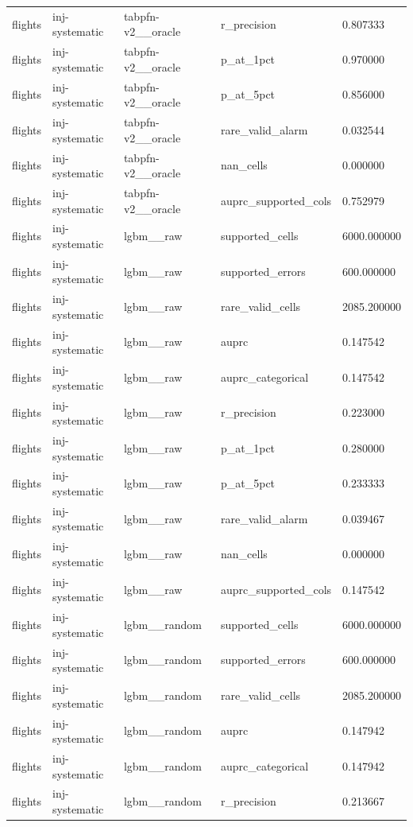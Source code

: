 \begin{tabular}{lllll}
flights & inj-systematic & tabpfn-v2\_\_oracle & r\_precision & 0.807333 \\
flights & inj-systematic & tabpfn-v2\_\_oracle & p\_at\_1pct & 0.970000 \\
flights & inj-systematic & tabpfn-v2\_\_oracle & p\_at\_5pct & 0.856000 \\
flights & inj-systematic & tabpfn-v2\_\_oracle & rare\_valid\_alarm & 0.032544 \\
flights & inj-systematic & tabpfn-v2\_\_oracle & nan\_cells & 0.000000 \\
flights & inj-systematic & tabpfn-v2\_\_oracle & auprc\_supported\_cols & 0.752979 \\
flights & inj-systematic & lgbm\_\_raw & supported\_cells & 6000.000000 \\
flights & inj-systematic & lgbm\_\_raw & supported\_errors & 600.000000 \\
flights & inj-systematic & lgbm\_\_raw & rare\_valid\_cells & 2085.200000 \\
flights & inj-systematic & lgbm\_\_raw & auprc & 0.147542 \\
flights & inj-systematic & lgbm\_\_raw & auprc\_categorical & 0.147542 \\
flights & inj-systematic & lgbm\_\_raw & r\_precision & 0.223000 \\
flights & inj-systematic & lgbm\_\_raw & p\_at\_1pct & 0.280000 \\
flights & inj-systematic & lgbm\_\_raw & p\_at\_5pct & 0.233333 \\
flights & inj-systematic & lgbm\_\_raw & rare\_valid\_alarm & 0.039467 \\
flights & inj-systematic & lgbm\_\_raw & nan\_cells & 0.000000 \\
flights & inj-systematic & lgbm\_\_raw & auprc\_supported\_cols & 0.147542 \\
flights & inj-systematic & lgbm\_\_random & supported\_cells & 6000.000000 \\
flights & inj-systematic & lgbm\_\_random & supported\_errors & 600.000000 \\
flights & inj-systematic & lgbm\_\_random & rare\_valid\_cells & 2085.200000 \\
flights & inj-systematic & lgbm\_\_random & auprc & 0.147942 \\
flights & inj-systematic & lgbm\_\_random & auprc\_categorical & 0.147942 \\
flights & inj-systematic & lgbm\_\_random & r\_precision & 0.213667 \\

\end{tabular}
